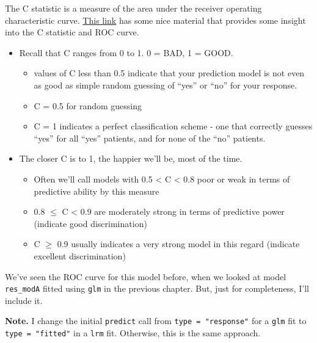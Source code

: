 \documentclass[]{book}
\providecommand{\tightlist}{%
  \setlength{\itemsep}{0pt}\setlength{\parskip}{0pt}}
\theoremstyle{definition}
\theoremstyle{definition}
\theoremstyle{definition}
\theoremstyle{remark}
\begin{document}
The C statistic is a measure of the area under the receiver operating
characteristic curve.
\href{http://blog.yhat.com/posts/roc-curves.html}{This link} has some
nice material that provides some insight into the C statistic and ROC
curve.

\begin{itemize}
\tightlist
\item
  Recall that C ranges from 0 to 1. 0 = BAD, 1 = GOOD.

  \begin{itemize}
  \tightlist
  \item
    values of C less than 0.5 indicate that your prediction model is not
    even as good as simple random guessing of ``yes'' or ``no'' for your
    response.
  \item
    C = 0.5 for random guessing
  \item
    C = 1 indicates a perfect classification scheme - one that correctly
    guesses ``yes'' for all ``yes'' patients, and for none of the ``no''
    patients.
  \end{itemize}
\item
  The closer C is to 1, the happier we'll be, most of the time.

  \begin{itemize}
  \tightlist
  \item
    Often we'll call models with 0.5 \textless{} C \textless{} 0.8 poor
    or weak in terms of predictive ability by this measure
  \item
    0.8 \(\leq\) C \textless{} 0.9 are moderately strong in terms of
    predictive power (indicate good discrimination)
  \item
    C \(\geq\) 0.9 usually indicates a very strong model in this regard
    (indicate excellent discrimination)
  \end{itemize}
\end{itemize}

We've seen the ROC curve for this model before, when we looked at model
\texttt{res\_modA} fitted using \texttt{glm} in the previous chapter.
But, just for completeness, I'll include it.

\textbf{Note.} I change the initial \texttt{predict} call from
\texttt{type\ =\ "response"} for a \texttt{glm} fit to
\texttt{type\ =\ "fitted"} in a \texttt{lrm} fit. Otherwise, this is the
same approach.
\end{document}
